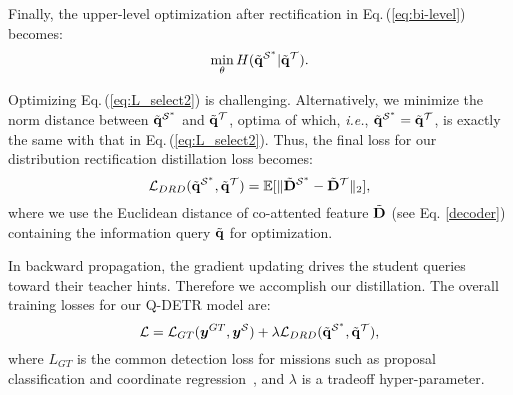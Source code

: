 \documentclass[10pt,twocolumn,letterpaper]{article}
\begin{document}
%
%
Finally, the upper-level optimization after rectification in Eq.\,(\ref{eq:bi-level}) becomes: 
\begin{equation}
\begin{aligned}
 \mathop{\min}_{\theta} H(\tilde{{\bf q}}^{\mathcal{S}^*}|\tilde{{\bf q}}^{\mathcal{T}}). 
\end{aligned}
\label{eq:L_select2}
\end{equation}
% 


Optimizing Eq.\,(\ref{eq:L_select2}) is challenging. Alternatively, we minimize the norm distance between $\tilde{\bf q}^{\mathcal{S}^*}$ and $\tilde{{\bf q}}^{\mathcal{T}}$, optima of which, \emph{i.e.}, $\tilde{\bf q}^{\mathcal{S}^*} = \tilde{\bf q}^{\mathcal{T}}$, is exactly the same with that in Eq.\,(\ref{eq:L_select2}).
%
%
Thus, the final loss for our distribution rectification distillation loss becomes: 
\begin{equation}
\mathcal{L}_{DRD}(\tilde{{\bf q}}^{\mathcal{S}^*}, \tilde{{\bf q}}^{\mathcal{T}}) = \mathbb{E}[\|\tilde{\bf D}^{\mathcal{S}^*} - \tilde{\bf D}^{\mathcal{T}}\|_2],
\label{drd}
\end{equation}
%
where we use the Euclidean distance of co-attented feature $\tilde{\bf D}$ (see Eq. \ref{decoder}) containing the information query $\tilde{\bf q}$ for optimization.

In backward propagation, the gradient updating drives the student queries toward their teacher hints. Therefore we accomplish our distillation.
%
The overall training losses for our Q-DETR model are:
%
\begin{equation}
\small
\mathcal{L} = \mathcal{L}_{GT}(\bm{y}^{GT}, \bm{y}^{\mathcal{S}}) + \lambda \mathcal{L}_{DRD}(\tilde{{\bf q}}^{\mathcal{S}^*}, \tilde{{\bf q}}^{\mathcal{T}}),
\label{final}
\end{equation}
%
%
where $L_{GT}$ is the common detection loss for missions such as proposal classification and coordinate regression~\cite{carion2020end}, and $\lambda$ is a tradeoff hyper-parameter.
\end{document}
